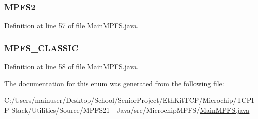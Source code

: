 \subsubsection[{M\+P\+F\+S2}]{\setlength{\rightskip}{0pt plus 5cm}M\+P\+F\+S2}\label{enum_microchip_m_p_f_s_1_1_main_m_p_f_s_1_1_m_p_f_s___o_u_t_p_u_t___v_e_r_s_i_o_n_a5a92d98af3b89fdd193668f0fe3dedb8}


Definition at line 57 of file Main\+M\+P\+F\+S.\+java.

\hypertarget{enum_microchip_m_p_f_s_1_1_main_m_p_f_s_1_1_m_p_f_s___o_u_t_p_u_t___v_e_r_s_i_o_n_ac437c2468b108192ddb4a23488d8be53}{}
\subsubsection[{M\+P\+F\+S\+\_\+\+C\+L\+A\+S\+S\+I\+C}]{\setlength{\rightskip}{0pt plus 5cm}M\+P\+F\+S\+\_\+\+C\+L\+A\+S\+S\+I\+C}\label{enum_microchip_m_p_f_s_1_1_main_m_p_f_s_1_1_m_p_f_s___o_u_t_p_u_t___v_e_r_s_i_o_n_ac437c2468b108192ddb4a23488d8be53}


Definition at line 58 of file Main\+M\+P\+F\+S.\+java.



The documentation for this enum was generated from the following file\+:\begin{DoxyCompactItemize}
\item 
C\+:/\+Users/mainuser/\+Desktop/\+School/\+Senior\+Project/\+Eth\+Kit\+T\+C\+P/\+Microchip/\+T\+C\+P\+I\+P Stack/\+Utilities/\+Source/\+M\+P\+F\+S21 -\/ Java/src/\+Microchip\+M\+P\+F\+S/\hyperlink{_main_m_p_f_s_8java}{Main\+M\+P\+F\+S.\+java}\end{DoxyCompactItemize}
